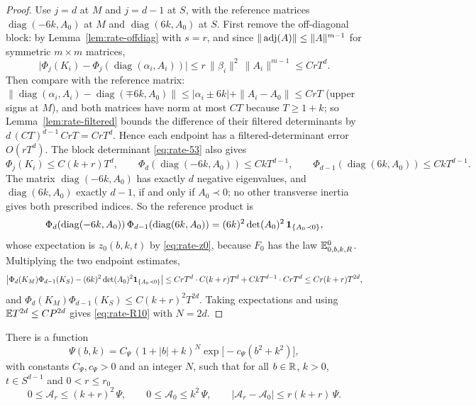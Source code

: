 \begin{proof}
Use $j=d$ at $M$ and $j=d-1$ at $S$, with the reference matrices $\operatorname{diag}(-6k,A_0)$ at $M$ and $\operatorname{diag}(6k,A_0)$ at $S$. First remove the off-diagonal block: by Lemma~\ref{lem:rate-offdiag} with $s=r$, and since $\|\operatorname{adj}(A)\|\le\|A\|^{m-1}$ for symmetric $m\times m$ matrices,
\[
\bigl|\Phi_j(K_i)-\Phi_j(\operatorname{diag}(\alpha_i,A_i))\bigr|\le r\,\|\beta_i\|^2\,\|A_i\|^{m-1}\le CrT^d .
\]
Then compare with the reference matrix: $\|\operatorname{diag}(\alpha_i,A_i)-\operatorname{diag}(\mp6k,A_0)\|\le|\alpha_i\pm6k|+\|A_i-A_0\|\le CrT$ (upper signs at $M$), and both matrices have norm at most $CT$ because $T\ge1+k$; so Lemma~\ref{lem:rate-filtered} bounds the difference of their filtered determinants by $d\,(CT)^{d-1}\,CrT=CrT^d$. Hence each endpoint has a filtered-determinant error $O(rT^d)$. The block determinant \eqref{eq:rate-53} also gives
\[
\Phi_j(K_i)\le C(k+r)T^d,\qquad \Phi_d(\operatorname{diag}(-6k,A_0))\le CkT^{d-1},\qquad \Phi_{d-1}(\operatorname{diag}(6k,A_0))\le CkT^{d-1}.
\]
The matrix $\operatorname{diag}(-6k,A_0)$ has exactly $d$ negative eigenvalues, and $\operatorname{diag}(6k,A_0)$ exactly $d-1$, if and only if $A_0\prec0$; no other transverse inertia gives both prescribed indices. So the reference product is
\[
\Phi_d(\operatorname{diag}(-6k,A_0))\,\Phi_{d-1}(\operatorname{diag}(6k,A_0))=(6k)^2\det(A_0)^2\,\mathbf 1_{\{A_0\prec0\}},
\]
whose expectation is $z_0(b,k,t)$ by \eqref{eq:rate-z0}, because $F_0$ has the law $\mathbb E^0_{0,b,k,R}$. Multiplying the two endpoint estimates,
\[
\bigl|\Phi_d(K_M)\Phi_{d-1}(K_S)-(6k)^2\det(A_0)^2\mathbf 1_{\{A_0\prec0\}}\bigr|\le CrT^d\cdot C(k+r)T^d+CkT^{d-1}\cdot CrT^d\le Cr(k+r)T^{2d},
\]
and $\Phi_d(K_M)\Phi_{d-1}(K_S)\le C(k+r)^2T^{2d}$. Taking expectations and using $\mathbb E T^{2d}\le CP^{2d}$ gives \eqref{eq:rate-R10} with $N=2d$.
\end{proof}

\begin{corollary}\label{cor:rate-majorant}
There is a function
\begin{equation}\label{eq:rate-Psi}
\Psi(b,k)=C_\Psi\,(1+|b|+k)^{N}\exp\bigl[-c_\Psi(b^2+k^2)\bigr],
\end{equation}
with constants $C_\Psi,c_\Psi>0$ and an integer $N$, such that for all $b\in\mathbb R$, $k>0$, $t\in S^{d-1}$ and $0<r\le r_0$
\begin{equation}\label{eq:rate-R11}
0\le\mathcal A_r\le(k+r)^2\,\Psi,\qquad 0\le\mathcal A_0\le k^2\,\Psi,\qquad |\mathcal A_r-\mathcal A_0|\le r(k+r)\,\Psi .
\end{equation}
\end{corollary}

